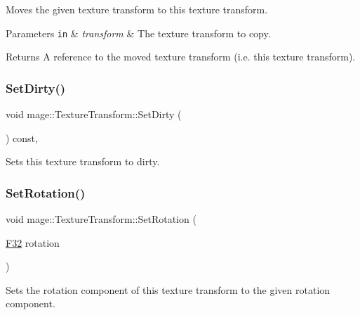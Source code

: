 Moves the given texture transform to this texture transform.


\begin{DoxyParams}[1]{Parameters}
\mbox{\tt in}  & {\em transform} & The texture transform to copy. \\
\hline
\end{DoxyParams}
\begin{DoxyReturn}{Returns}
A reference to the moved texture transform (i.\+e. this texture transform). 
\end{DoxyReturn}
\hypertarget{classmage_1_1_texture_transform_a471542a6be04f39307dd10ba2bb67ce1}{}\label{classmage_1_1_texture_transform_a471542a6be04f39307dd10ba2bb67ce1} 
\subsubsection{\texorpdfstring{Set\+Dirty()}{SetDirty()}}
{\footnotesize\ttfamily void mage\+::\+Texture\+Transform\+::\+Set\+Dirty (\begin{DoxyParamCaption}{ }\end{DoxyParamCaption}) const\hspace{0.3cm}{\ttfamily [private]}, {\ttfamily [noexcept]}}

Sets this texture transform to dirty. \hypertarget{classmage_1_1_texture_transform_aadf399acb4be8b747e71224a3e1f723c}{}\label{classmage_1_1_texture_transform_aadf399acb4be8b747e71224a3e1f723c} 
\subsubsection{\texorpdfstring{Set\+Rotation()}{SetRotation()}}
{\footnotesize\ttfamily void mage\+::\+Texture\+Transform\+::\+Set\+Rotation (\begin{DoxyParamCaption}\item[{\hyperlink{namespacemage_aa97e833b45f06d60a0a9c4fc22ae02c0}{F32}}]{rotation }\end{DoxyParamCaption})\hspace{0.3cm}{\ttfamily [noexcept]}}

Sets the rotation component of this texture transform to the given rotation component.


